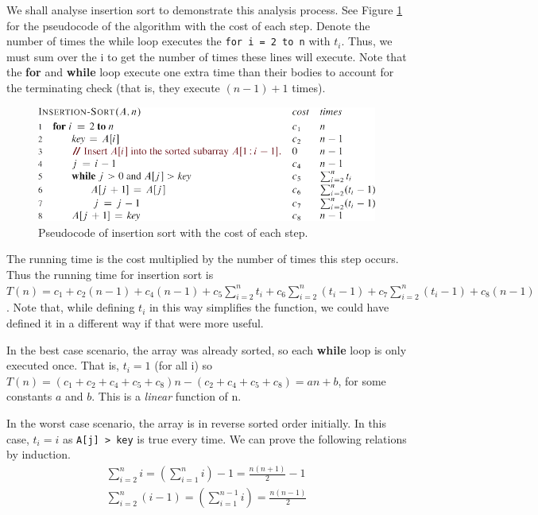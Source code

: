 \documentclass[12pt]{article}
\begin{document}
We shall analyse insertion sort to demonstrate this analysis process. See Figure \ref{Figure: insertion sort with costs} for the pseudocode
of the algorithm with the cost of each step. Denote the number of times the while loop executes the \texttt{for i = 2 to n} with $t_i$.
Thus, we must sum over the i to get the number of times these lines will execute. Note that the \textbf{for}
and \textbf{while} loop execute one extra time than their bodies to account for the terminating check (that is, they execute $(n - 1) + 1$ times).
\begin{figure}[ht]\centering
    \includegraphics[angle=0]{Figures/insertion-sort-with-costs.pdf}
    \caption{Pseudocode of insertion sort with the cost of each step.}
    \label{Figure: insertion sort with costs}
\end{figure}
The running time is the cost multiplied by the number of times this step occurs. Thus the running time
for insertion sort is $T(n) = c_1 + c_2(n - 1) + c_4(n - 1) + c_5\sum_{i = 2}^{n}t_i + c_6\sum_{i = 2}^{n}(t_i - 1)
+ c_7\sum_{i = 2}^{n}(t_i - 1) + c_8(n - 1)$. Note that, while defining $t_i$ in this way simplifies the function, we could have defined it in a different
way if that were more useful.

In the best case scenario, the array was already sorted, so each \textbf{while} loop is only executed
once. That is, $t_i = 1$ (for all i) so $T(n) = (c_1 + c_2 + c_4 + c_5 + c_8)n - (c_2 + c_4 + c_5 + c_8) = an + b$, for
some constants $a$ and $b$. This is a \textit{linear} function of n.

In the worst case scenario, the array is in reverse sorted order initially. In this case, $t_i = i$ as \texttt{A[j] > key} is
true every time. We can prove the following relations by induction.
\begin{eqnarray*}
    \sum_{i = 2}^{n}i = \left(\sum_{i = 1}^{n}i\right) - 1 = \frac{n(n + 1)}{2} - 1\\
    \sum_{i = 2}^{n}(i - 1) = \left(\sum_{i = 1}^{n - 1}i\right) = \frac{n(n - 1)}{2}
\end{eqnarray*}
\end{document}
